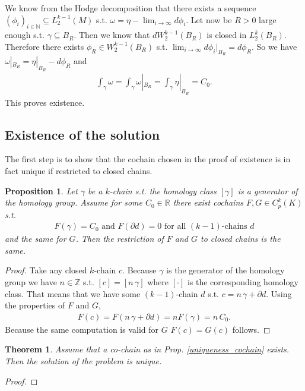 \documentclass[12pt,a4paper]{article}
\newtheorem{proposition}{Proposition}
\newtheorem{theorem}{Theorem}
\newcommand{\real}{\mathbb{R}}
\begin{document}
We know from the Hodge decomposition that there exists a sequence
$(\phi_i)_{i\in \mathbb{N}} \subseteq L^{k-1}_2(M)$ s.t. 
$\omega = \eta - \lim_{i \rightarrow \infty} d\phi_i$.
Let now be $R>0$ large enough s.t. $\gamma \subseteq B_R$. Then we know that
$d W^{k-1}_2(B_R)$ is closed in $L_2^k(B_R)$. Therefore there exists 
$\phi_R \in  W^{k-1}_2(B_R)$ s.t. 
$\lim_{i \rightarrow \infty} d\phi_i|_{B_R} = d\phi_R$. So we have
$\omega|_{B_R} = \eta|_{B_R} - d\phi_R$ and 
\begin{align*}
\int_\gamma \omega = \int_\gamma \omega|_{B_R} = \int_\gamma \eta|_{B_R} = C_0.
\end{align*}
This proves existence.

\subsection{Existence of the solution}

The first step is to show that the cochain chosen in the proof of existence
is in fact unique if restricted to closed chains.

\begin{proposition}
    Let $\gamma$ be a $k$-chain s.t. the homology class $[\gamma]$ 
    is a generator of the homology group. Assume for some $C_0 \in \real$ 
    there exist cochains $F,G \in C^k_p(K)$ s.t.
    \begin{align*}
    F(\gamma) = C_0 \text{ and } F(\partial d) = 0 
    \text{ for all } (k-1) \text{-chains } d
    \end{align*}
    and the same for $G$. Then the restriction of $F$ and $G$ to closed 
    chains is the same.
\end{proposition} \label{uniqueness_cochain}
\begin{proof}
    Take any closed $k$-chain $c$. Because $\gamma$ is the generator of the 
    homology group we have $n \in \mathbb{Z}$ s.t. $[c] = [n \, \gamma]$
    where $[\cdot]$ is the corresponding homology class. That means that we have
    some $(k-1)$-chain $d$ s.t. $c = n \, \gamma + \partial d$. Using the 
    properties of $F$ and $G$,
    \begin{align*}
        F(c) = F(n \, \gamma + \partial d) = n F(\gamma) = n \, C_0.
    \end{align*}
    Because the same computation is valid for $G$ $F(c) = G(c)$ follows.
\end{proof}

\begin{theorem}
    Assume that a co-chain as in Prop. \ref{uniqueness_cochain} exists. 
    Then the solution of the problem is unique.
\end{theorem}
\begin{proof}
    
\end{proof}
\end{document}
